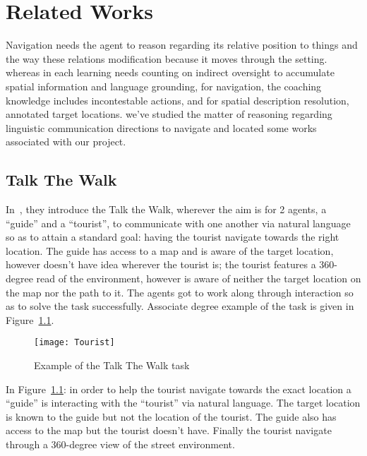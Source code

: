 \chapter{Related Works}
Navigation needs the agent to reason regarding its relative position to things and the way these relations modification because it moves through the setting. whereas in each learning needs counting on indirect oversight to accumulate spatial information and language grounding, for navigation, the coaching knowledge includes incontestable actions, and for spatial description resolution, annotated target locations. we've studied the matter of reasoning regarding linguistic communication directions to navigate and located some works associated with our project.

\section{Talk The Walk}
In~\cite{DBLP:journals/corr/abs-1807-03367}, they introduce the Talk the Walk, wherever the aim is for 2 agents, a “guide” and a “tourist”, to communicate with one another via natural language so as to attain a standard goal: having the tourist navigate towards the right location. The guide has access to a map and is aware of the target location, however doesn't have idea wherever the tourist is; the tourist features a 360-degree read of the environment, however is aware of neither the target location on the map nor the path to it. The agents got to work along through interaction so as to solve the task successfully. Associate degree example of the task is given in Figure~\ref{fig:3}. 

\begin{figure}[htbp]
    \centering
    \texttt{[image: Tourist]}
    \caption{ Example of the Talk The Walk task~\cite{DBLP:journals/corr/abs-1807-03367}}
    \label{fig:3}
\end{figure}
In Figure~\ref{fig:3}: in order to help the tourist navigate towards the exact location a “guide” is interacting with the “tourist”  via natural language. The target location is known to the guide but not the location of the tourist. The guide also has access to the map but the tourist doesn't have. Finally the tourist navigate through a 360-degree view of the street environment.

